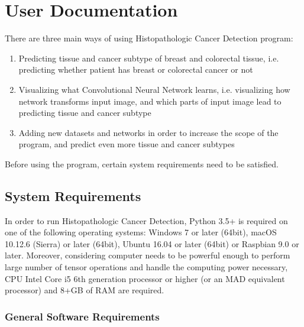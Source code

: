 \chapter{User Documentation} %
\label{ch:user}

There are three main ways of using Histopathologic Cancer Detection program:
\begin{enumerate}
	\itemsep 0em
	\item Predicting tissue and cancer subtype of breast and colorectal tissue, i.e. predicting whether patient has breast or colorectal cancer or not
	\item Visualizing what Convolutional Neural Network learns, i.e. visualizing how network transforms input image, and which parts of input image lead to predicting tissue and cancer subtype
	\item Adding new datasets and networks in order to increase the scope of the program, and predict even more tissue and cancer subtypes
\end{enumerate}
Before using the program, certain system requirements need to be satisfied.

\section{System Requirements}
\label{sysreq}

In order to run Histopathologic Cancer Detection, Python 3.5+ is required on one of the following operating systems: Windows 7 or later (64bit), macOS 10.12.6 (Sierra) or later (64bit), Ubuntu 16.04 or later (64bit) or Raspbian 9.0 or later. Moreover, considering computer needs to be powerful enough to perform large number of tensor operations and handle the computing power necessary, CPU Intel Core i5 6th generation processor or higher (or an MAD equivalent processor) and 8+GB of RAM are required.

\subsection{General Software Requirements}

